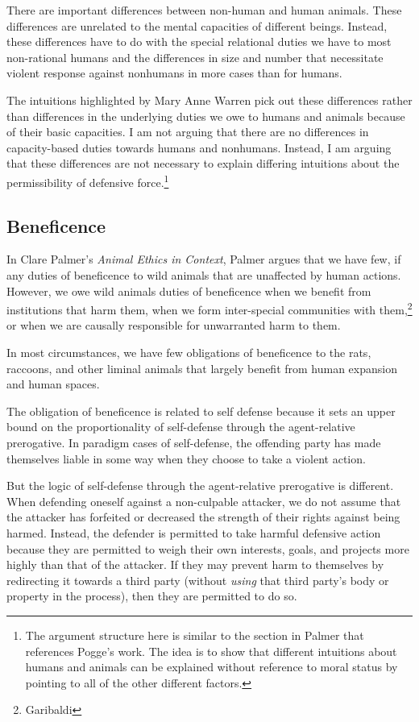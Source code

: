     There are important differences between non-human and human animals.
    These differences are unrelated to the mental capacities of different
    beings. Instead, these differences have to do with the special relational
    duties we have to most non-rational humans and the differences in size and
    number that necessitate violent response against nonhumans in more cases
    than for humans.

	The intuitions highlighted by Mary Anne Warren pick out these differences
	rather than differences in the underlying duties we owe to humans and
	animals because of their basic capacities. I am not arguing that there are
	no differences in capacity-based duties towards humans and nonhumans.
	Instead, I am arguing that these differences are not necessary to explain
	differing intuitions about the permissibility of defensive
	force.\footnote{The argument structure here is similar to the section in
		Palmer that references Pogge’s work. The idea is to show that different
	intuitions about humans and animals can be explained without reference to
	moral status by pointing to all of the other different factors.}

    \subsection{Beneficence}

		In Clare Palmer’s \emph{Animal Ethics in Context}, Palmer argues that
		we have few, if any duties of beneficence to wild animals that are
		unaffected by human actions. However, we owe wild animals duties of
		beneficence when we benefit from institutions that harm them, when we
		form inter-special communities with them,\footnote{Garibaldi} or when
		we are causally responsible for unwarranted harm to them.

		In most circumstances, we have few obligations of beneficence to the
		rats, raccoons, and other liminal animals that largely benefit from
		human expansion and human spaces.

		The obligation of beneficence is related to self defense because it sets
		an upper bound on the proportionality of self-defense through the
		agent-relative prerogative. In paradigm cases of self-defense, the
		offending party has made themselves liable in some way when they choose
		to take a violent action.

		But the logic of self-defense through the agent-relative prerogative is
		different. When defending oneself against a non-culpable attacker, we do
		not assume that the attacker has forfeited or decreased the strength
		of their rights against being harmed. Instead, the defender is
		permitted to take harmful defensive action because they are permitted
		to weigh their own interests, goals, and projects more highly than that
		of the attacker. If they may prevent harm to themselves by redirecting
		it towards a third party (without \emph{using} that third party’s body
		or property in the process), then they are permitted to do so.

